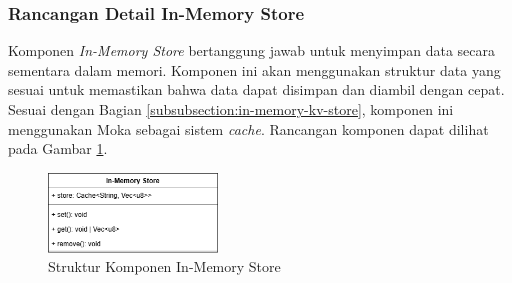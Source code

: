 \subsubsection{Rancangan Detail In-Memory Store}
\label{subsubsection:detail-in-memory-store}

Komponen \textit{In-Memory Store} bertanggung jawab untuk menyimpan data secara sementara dalam memori. Komponen ini akan menggunakan struktur data yang sesuai untuk memastikan bahwa data dapat disimpan dan diambil dengan cepat. Sesuai dengan Bagian \ref{subsubsection:in-memory-kv-store}, komponen ini menggunakan Moka sebagai sistem \textit{cache}. Rancangan komponen dapat dilihat pada Gambar \ref{fig:in-memory-store-component}.

\begin{figure}[ht]
    \centering
    \includegraphics[width=0.4\textwidth]{resources/chapter-3/in-memory-store-component.png}
    \caption{Struktur Komponen In-Memory Store}
    \label{fig:in-memory-store-component}
\end{figure}